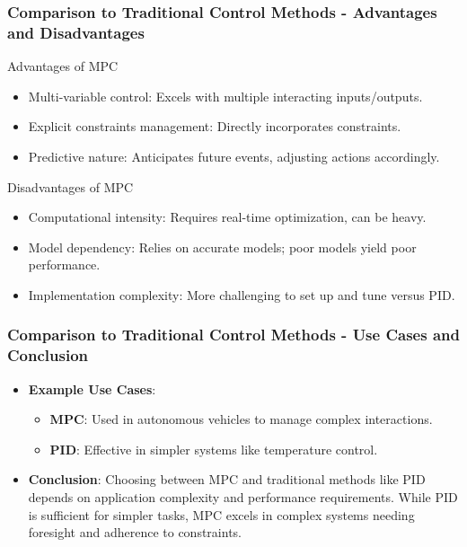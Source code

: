 \documentclass[aspectratio=169]{beamer}
\begin{document}
\begin{frame}[fragile]
    \frametitle{Comparison to Traditional Control Methods - Advantages and Disadvantages}
    \begin{block}{Advantages of MPC}
        \begin{itemize}
            \item Multi-variable control: Excels with multiple interacting inputs/outputs.
            \item Explicit constraints management: Directly incorporates constraints.
            \item Predictive nature: Anticipates future events, adjusting actions accordingly.
        \end{itemize}
    \end{block}

    \begin{block}{Disadvantages of MPC}
        \begin{itemize}
            \item Computational intensity: Requires real-time optimization, can be heavy.
            \item Model dependency: Relies on accurate models; poor models yield poor performance.
            \item Implementation complexity: More challenging to set up and tune versus PID.
        \end{itemize}
    \end{block}
\end{frame}

\begin{frame}[fragile]
    \frametitle{Comparison to Traditional Control Methods - Use Cases and Conclusion}
    \begin{itemize}
        \item \textbf{Example Use Cases}:
        \begin{itemize}
            \item \textbf{MPC}: Used in autonomous vehicles to manage complex interactions.
            \item \textbf{PID}: Effective in simpler systems like temperature control.
        \end{itemize}
        
        \item \textbf{Conclusion}:
        Choosing between MPC and traditional methods like PID depends on application complexity and performance requirements. While PID is sufficient for simpler tasks, MPC excels in complex systems needing foresight and adherence to constraints.
    \end{itemize}
\end{frame}
\end{document}
